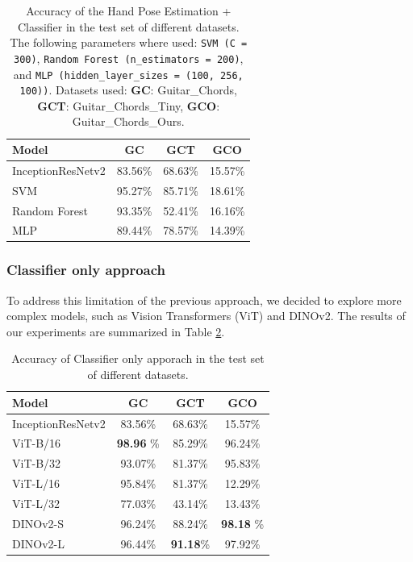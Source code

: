 \documentclass[10pt,twocolumn,letterpaper]{article}
\begin{document}
\begin{table}[h]
    \centering
    \begin{tabular}{lccc}
        \toprule
        \textbf{Model}    & \textbf{GC} & \textbf{GCT} & \textbf{GCO} \\
        \midrule
        InceptionResNetv2 & 83.56\%     & 68.63\%      & 15.57\%      \\
        \midrule
        SVM               & 95.27\%     & 85.71\%      & 18.61\%      \\
        Random Forest     & 93.35\%     & 52.41\%      & 16.16\%      \\
        MLP               & 89.44\%     & 78.57\%      & 14.39\%      \\
        \bottomrule
    \end{tabular}
    \caption{Accuracy of the Hand Pose Estimation + Classifier in the test set of different datasets. The following parameters where used: \texttt{SVM (C = 300)}, \texttt{Random Forest (n\_estimators = 200)}, and \texttt{MLP (hidden\_layer\_sizes = (100, 256, 100))}. Datasets used: \textbf{GC}: Guitar\_Chords, \textbf{GCT}: Guitar\_Chords\_Tiny, \textbf{GCO}: Guitar\_Chords\_Ours.}
    \label{tab:handpose-classifier-results}
\end{table}

\subsubsection{Classifier only approach}
To address this limitation of the previous approach, we decided to explore more complex models, such as Vision Transformers (ViT) and DINOv2. The results of our experiments are summarized in Table \ref{tab:transformer-models-results}.

\begin{table}[h]
    \centering
    \begin{tabular}{lccc}
        \toprule
        \textbf{Model}    & \textbf{GC} & \textbf{GCT} & \textbf{GCO} \\
        \midrule
        InceptionResNetv2 & 83.56\%     & 68.63\%      & 15.57\%      \\
        \midrule
        ViT-B/16          & \textbf{98.96} \%     & 85.29\%      & 96.24\%      \\
        ViT-B/32          & 93.07\%     & 81.37\%      & 95.83\%      \\
        ViT-L/16          & 95.84\%     & 81.37\%      & 12.29\%      \\
        ViT-L/32          & 77.03\%     & 43.14\%      & 13.43\%      \\
        DINOv2-S          & 96.24\%     & 88.24\%      & \textbf{98.18} \%      \\
        DINOv2-L          & 96.44\%     & \textbf{91.18}\%      & 97.92\%      \\
        \bottomrule
    \end{tabular}
    \caption{Accuracy of Classifier only apporach in the test set of different datasets.}
    \label{tab:transformer-models-results}
\end{table}
\end{document}

